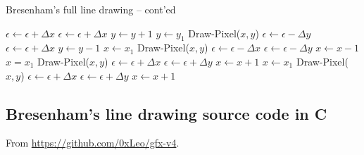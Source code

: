\documentclass[a4paper]{article}
\begin{document}
\begin{algorithm}[H]
\caption{Bresenham's full line drawing -- cont'ed}
\label{alg:bres_pt2}
\begin{algorithmic}[1]
	\Indent
	\State $\epsilon \leftarrow \epsilon + \Delta x$
		\State $\epsilon \leftarrow \epsilon + \Delta x$
		\State $y \leftarrow y + 1$
	  
		\State $y\leftarrow y_1$
			\State Draw-Pixel($x,y$)
			\State $\epsilon \leftarrow \epsilon - \Delta y$
				\State $\epsilon \leftarrow \epsilon + \Delta x$
				\State $y \leftarrow y - 1$
			\EndIf
		\EndFor
	 
		\State $x\leftarrow x_1$
			\State Draw-Pixel($x,y$)
			\State $\epsilon \leftarrow \epsilon - \Delta x$
				\State $\epsilon \leftarrow \epsilon - \Delta y$
				\State $x \leftarrow x - 1$
			\EndIf
		\EndFor
	 
		\State $x = x_1$
			\State Draw-Pixel($x,y$)
			\State $\epsilon \leftarrow \epsilon + \Delta x$
				\State $\epsilon \leftarrow \epsilon + \Delta y$
				\State $x\leftarrow x+1$
			\EndIf
		\EndFor
	 
		\State $x\leftarrow x_1$
			\State Draw-Pixel($x,y$)
			\State $\epsilon \leftarrow \epsilon + \Delta x$
				\State $\epsilon \leftarrow \epsilon + \Delta y$
				\State $x\leftarrow x+ 1$
			\EndIf
		\EndFor
	 
	\State {}
	\EndIf
	\EndIndent
\end{algorithmic}
\end{algorithm}


\newpage
\subsection{Bresenham's line drawing source code in C}
\label{app:bresenham_full_src}

From \url{https://github.com/0xLeo/gfx-v4}.

\end{document}
